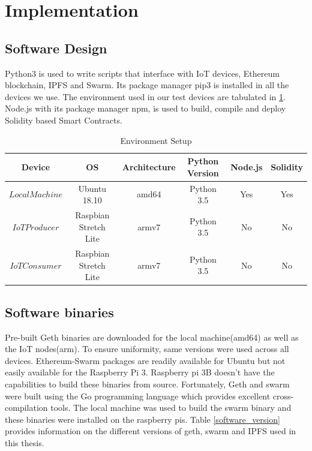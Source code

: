 \documentclass[11pt,openright]{report}
\begin{document}
\section{Implementation}
\subsection{Software Design}
Python3 is used to write scripts that interface with IoT devices, Ethereum blockchain, IPFS and Swarm. Its package manager pip3 is installed in all the devices we use. The environment used in our test devices are tabulated in \ref{environment_setup}. Node.js with its package manager npm, is used to build, compile and deploy Solidity based Smart Contracts. 

\begin{table}[!htbp]
	\renewcommand{\arraystretch}{1}
	\caption{Environment Setup}
	\label{environment_setup}
	\centering
	\begin{tabular}{|c|c|c|c|c|c|}
		\hline
		\bfseries Device & \bfseries OS & \bfseries Architecture & \bfseries Python Version & \bfseries Node.js & \bfseries Solidity\\
		\hline\hline
		$Local Machine$ & Ubuntu 18.10 & amd64 & Python 3.5 &  Yes & Yes\\ \hline
		$IoT Producer$ & Raspbian Stretch Lite & armv7 & Python 3.5 &  No & No\\ \hline
		$IoT Consumer$ & Raspbian Stretch Lite & armv7 & Python 3.5 &  No & No\\ \hline
	\end{tabular}
\end{table}

\subsection{Software binaries}
Pre-built Geth binaries are downloaded for the local machine(amd64) as well as the IoT nodes(arm). To ensure uniformity, same versions were used across all devices. Ethereum-Swarm packages are readily available for Ubuntu but not easily available for the Raspberry Pi 3.
Raspberry pi 3B doesn't have the capabilities to build these binaries from source.
Fortunately, Geth and swarm were built using the Go programming language which provides excellent cross-compilation tools. The local machine was used to build the swarm binary and these binaries were installed on the raspberry pis. Table \ref{software_version} provides information on the different versions of geth, swarm and IPFS used in this thesis.
\end{document}

